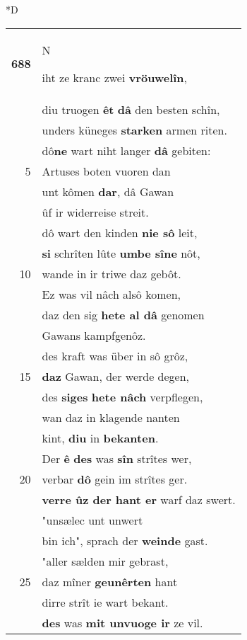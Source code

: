 \documentclass[8pt,a4paper,notitlepage]{article}
\begin{document}
\begin{table}[ht]
\begin{minipage}[t]{0.5\linewidth}
\small
\begin{center}*D
\end{center}
\begin{tabular}{rl}
\textbf{688} & \begin{large}N\end{large}iht ze kranc zwei \textbf{vröuwelîn},\\ 
 & diu truogen \textbf{êt} \textbf{dâ} den besten schîn,\\ 
 & unders küneges \textbf{starken} armen riten.\\ 
 & dô\textbf{ne} wart niht langer \textbf{dâ} gebiten:\\ 
5 & Artuses boten vuoren dan\\ 
 & unt kômen \textbf{dar}, dâ Gawan\\ 
 & ûf ir widerreise streit.\\ 
 & dô wart den kinden \textbf{nie sô} leit,\\ 
 & \textbf{si} schrîten lûte \textbf{umbe sîne} nôt,\\ 
10 & wande in ir triwe daz gebôt.\\ 
 & Ez was vil nâch alsô komen,\\ 
 & daz den sig \textbf{hete al dâ} genomen\\ 
 & Gawans kampfgenôz.\\ 
 & des kraft was über in sô grôz,\\ 
15 & \textbf{daz} Gawan, der werde degen,\\ 
 & des \textbf{siges} \textbf{hete nâch} verpflegen,\\ 
 & wan daz in klagende nanten\\ 
 & kint, \textbf{diu} in \textbf{bekanten}.\\ 
 & Der \textbf{ê} \textbf{des} was \textbf{sîn} strîtes wer,\\ 
20 & verbar \textbf{dô} gein im strîtes ger.\\ 
 & \textbf{verre ûz der hant er} warf daz swert.\\ 
 & "unsælec unt unwert\\ 
 & bin ich", sprach der \textbf{weinde} gast.\\ 
 & "aller sælden mir gebrast,\\ 
25 & daz mîner \textbf{geunêrten} hant\\ 
 & dirre strît ie wart bekant.\\ 
 & \textbf{des} was \textbf{mit unvuoge ir} ze vil.\\ 

\end{tabular}
\end{minipage}
\end{table}
\end{document}
